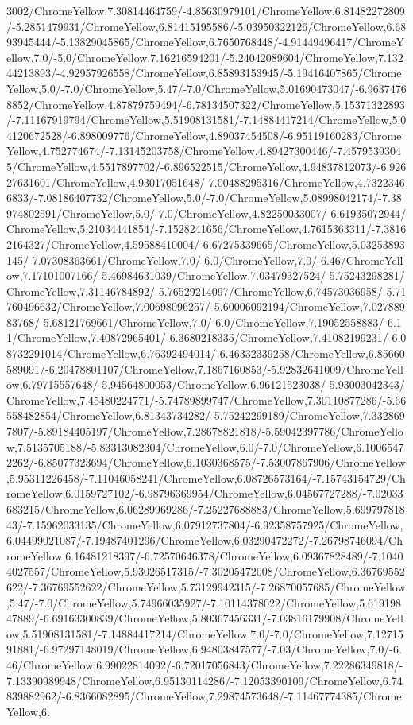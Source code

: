 {\begin{tikzternal}
3002/ChromeYellow,7.30814464759/-4.85630979101/ChromeYellow,6.81482272809/-5.2851479931/ChromeYellow,6.81415195586/-5.03950322126/ChromeYellow,6.6893945444/-5.13829045865/ChromeYellow,6.7650768448/-4.91449496417/ChromeYellow,7.0/-5.0/ChromeYellow,7.16216594201/-5.24042089604/ChromeYellow,7.13244213893/-4.92957926558/ChromeYellow,6.85893153945/-5.19416407865/ChromeYellow,5.0/-7.0/ChromeYellow,5.47/-7.0/ChromeYellow,5.01690473047/-6.96374768852/ChromeYellow,4.87879759494/-6.78134507322/ChromeYellow,5.15371322893/-7.11167919794/ChromeYellow,5.51908131581/-7.14884417214/ChromeYellow,5.04120672528/-6.898009776/ChromeYellow,4.89037454508/-6.95119160283/ChromeYellow,4.752774674/-7.13145203758/ChromeYellow,4.89427300446/-7.45795393045/ChromeYellow,4.5517897702/-6.896522515/ChromeYellow,4.94837812073/-6.92627631601/ChromeYellow,4.93017051648/-7.00488295316/ChromeYellow,4.73223466833/-7.08186407732/ChromeYellow,5.0/-7.0/ChromeYellow,5.08998042174/-7.38974802591/ChromeYellow,5.0/-7.0/ChromeYellow,4.82250033007/-6.61935072944/ChromeYellow,5.21034441854/-7.1528241656/ChromeYellow,4.7615363311/-7.38162164327/ChromeYellow,4.59588410004/-6.67275339665/ChromeYellow,5.03253893145/-7.07308363661/ChromeYellow,7.0/-6.0/ChromeYellow,7.0/-6.46/ChromeYellow,7.17101007166/-5.46984631039/ChromeYellow,7.03479327524/-5.75243298281/ChromeYellow,7.31146784892/-5.76529214097/ChromeYellow,6.74573036958/-5.71760496632/ChromeYellow,7.00698096257/-5.60006092194/ChromeYellow,7.02788983768/-5.68121769661/ChromeYellow,7.0/-6.0/ChromeYellow,7.19052558883/-6.11/ChromeYellow,7.40872965401/-6.3680218335/ChromeYellow,7.41082199231/-6.08732291014/ChromeYellow,6.76392494014/-6.46332339258/ChromeYellow,6.85660589091/-6.20478801107/ChromeYellow,7.1867160853/-5.92832641009/ChromeYellow,6.79715557648/-5.94564800053/ChromeYellow,6.96121523038/-5.93003042343/ChromeYellow,7.45480224771/-5.74789899747/ChromeYellow,7.30110877286/-5.66558482854/ChromeYellow,6.81343734282/-5.75242299189/ChromeYellow,7.3328697807/-5.89184405197/ChromeYellow,7.28678821818/-5.59042397786/ChromeYellow,7.5135705188/-5.83313082304/ChromeYellow,6.0/-7.0/ChromeYellow,6.10065472262/-6.85077323694/ChromeYellow,6.1030368575/-7.53007867906/ChromeYellow,5.95311226458/-7.11046058241/ChromeYellow,6.08726573164/-7.15743154729/ChromeYellow,6.0159727102/-6.98796369954/ChromeYellow,6.04567727288/-7.02033683215/ChromeYellow,6.06289969286/-7.25227688883/ChromeYellow,5.69979781843/-7.15962033135/ChromeYellow,6.07912737804/-6.92358757925/ChromeYellow,6.04499021087/-7.19487401296/ChromeYellow,6.03290472272/-7.26798746094/ChromeYellow,6.16481218397/-6.72570646378/ChromeYellow,6.09367828489/-7.10404027557/ChromeYellow,5.93026517315/-7.30205472008/ChromeYellow,6.36769552622/-7.36769552622/ChromeYellow,5.73129942315/-7.26870057685/ChromeYellow,5.47/-7.0/ChromeYellow,5.74966035927/-7.10114378022/ChromeYellow,5.61919847889/-6.69163300839/ChromeYellow,5.80367456331/-7.03816179908/ChromeYellow,5.51908131581/-7.14884417214/ChromeYellow,7.0/-7.0/ChromeYellow,7.1271591881/-6.97297148019/ChromeYellow,6.94803847577/-7.03/ChromeYellow,7.0/-6.46/ChromeYellow,6.99022814092/-6.72017056843/ChromeYellow,7.22286349818/-7.13390989948/ChromeYellow,6.95130114286/-7.12053390109/ChromeYellow,6.74839882962/-6.8366082895/ChromeYellow,7.29874573648/-7.11467774385/ChromeYellow,6.
\end{tikzternal}}
